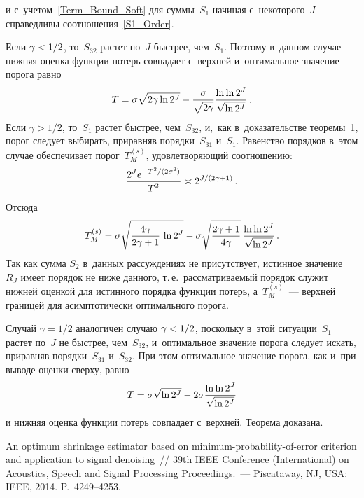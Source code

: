 \begin{multicols}{2}
\vspace*{-2pt}

\noindent
и с~учетом~\eqref{Term_Bound_Soft} для суммы~$S_1$ начиная с~некоторого~$J$ 
справедливы соотношения~\eqref{S1_Order}.

Если $\gamma\hm<1/2$, то~$S_{32}$ рас\-тет по~$J$ быст\-рее, чем~$S_1$. 
Поэтому в~данном случае нижняя оцен\-ка функции потерь совпадает 
с~верхней и~оптимальное значение порога равно
$$
T =\sigma\sqrt{2\gamma\ln2^J}-\displaystyle\frac{\displaystyle \sigma\mathstrut}{\displaystyle \sqrt{2\gamma}\mathstrut}\displaystyle\frac{\displaystyle \ln\ln2^J\mathstrut}{\displaystyle \sqrt{\ln2^J}\mathstrut}\,.
$$
Если $\gamma>1/2$, то~$S_1$ растет быст\-рее, чем~$S_{32}$, и,~как в~доказательстве тео\-ре\-мы~1, 
порог следует выбирать, приравняв порядки~$S_{31}$ и~$S_1$. Равенство порядков
 в~этом случае обеспечивает порог~$T_M^{(s)}$, удовле\-тво\-ря\-ющий соотношению:
\begin{equation*}
\displaystyle\frac{\displaystyle 2^{J}e^{-{T^2}/(2\sigma^2)}\mathstrut}{\displaystyle T^2\mathstrut} \asymp 2^{J/(2\gamma+1)}\,.
\end{equation*}
Отсюда
$$
T_M^{(s)}=\sigma\sqrt{\displaystyle\frac{\displaystyle 4\gamma\mathstrut}{\displaystyle 2\gamma+1\mathstrut}\,\ln2^J}-\sigma\sqrt{\displaystyle\frac{\displaystyle 2\gamma+1\mathstrut}{\displaystyle {4\gamma }\mathstrut}}
\,\displaystyle\frac{\displaystyle \ln\ln2^J\mathstrut}{\displaystyle \sqrt{\ln2^J}\mathstrut}\,.
$$
Так как сумма $S_2$ в~данных рассуждениях не присутствует,
 истинное значение~$R_J$ имеет порядок не ниже данного, т.\,е.\
  рас\-смат\-ри\-ва\-емый порядок служит ниж\-ней оценкой для истинного порядка функции потерь, а~$T_M^{(s)}$~--- 
  верх\-ней границей для асимп\-то\-ти\-че\-ски оптимального порога.

Случай $\gamma=1/2$ аналогичен случаю $\gamma\hm<1/2$, поскольку в~этой ситуации~$S_1$ рас\-тет по~$J$ 
не быст\-рее, чем~$S_{32}$, и~оптимальное значение порога следует искать, при\-рав\-няв порядки~$S_{31}$ 
и~$S_{32}$. При этом оптимальное значение порога, как и~при выводе оцен\-ки свер\-ху, равно
$$
T =\sigma\sqrt{\ln2^J}-2\sigma\displaystyle\frac{\displaystyle \ln\ln2^J\mathstrut}{\displaystyle \sqrt{\ln2^J}\mathstrut}
$$
и нижняя оценка функции потерь совпадает с~верх\-ней. Тео\-ре\-ма доказана.

\vspace*{-7pt}

{\small\frenchspacing
{%
\begin{thebibliography}{9}

\vspace*{-2pt}


An optimum shrinkage estimator based on minimum-probability-of-error criterion and application to signal 
denoising~// 39th IEEE Conference (International) on Acoustics, Speech and Signal Processing Proceedings.~--- 
Piscataway, NJ, USA: IEEE, 2014. P.~4249--4253.


\end{thebibliography}}}
\end{multicols}
